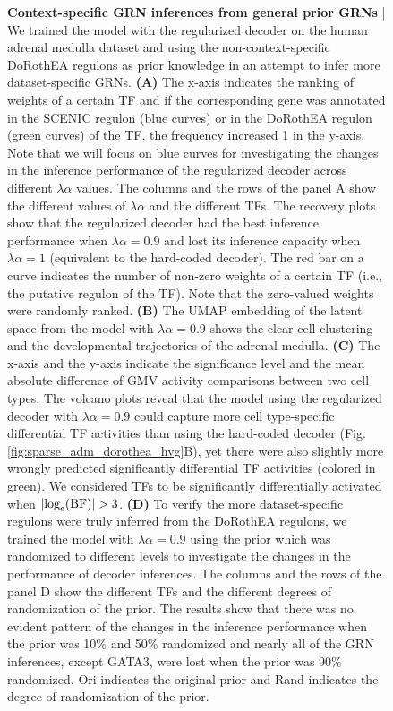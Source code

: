\begin{figure}[b!]
    \caption{\small{\textbf{Context-specific GRN inferences from general prior GRNs} | We trained the model with the regularized decoder on the human adrenal medulla dataset and using the non-context-specific DoRothEA regulons as prior knowledge in an attempt to infer more dataset-specific GRNs. \textbf{(A)} The x-axis indicates the ranking of weights of a certain TF and if the corresponding gene was annotated in the SCENIC regulon (blue curves) or in the DoRothEA regulon (green curves) of the TF, the frequency increased 1 in the y-axis. Note that we will focus on blue curves for investigating the changes in the inference performance of the regularized decoder across different $\lambda\alpha$ values. The columns and the rows of the panel A show the different values of $\lambda\alpha$ and the different TFs. The recovery plots show that the regularized decoder had the best inference performance when $\lambda\alpha = 0.9$ and lost its inference capacity when $\lambda\alpha = 1$ (equivalent to the hard-coded decoder). The red bar on a curve indicates the number of non-zero weights of a certain TF (i.e., the putative regulon of the TF). Note that the zero-valued weights were randomly ranked. \textbf{(B)} The UMAP embedding of the latent space from the model with $\lambda\alpha = 0.9$ shows the clear cell clustering and the developmental trajectories of the adrenal medulla. \textbf{(C)} The x-axis and the y-axis indicate the significance level and the mean absolute difference of GMV activity comparisons between two cell types. The volcano plots reveal that the model using the regularized decoder with $\lambda\alpha = 0.9$ could capture more cell type-specific differential TF activities than using the hard-coded decoder (Fig.\ref{fig:sparse_adm_dorothea_hvg}B), yet there were also slightly more wrongly predicted significantly differential TF activities (colored in green). We considered TFs to be significantly differentially activated when $|\textnormal{log}_e(\textnormal{BF})|>3$. \textbf{(D)} To verify the more dataset-specific regulons were truly inferred from the DoRothEA regulons, we trained the model with $\lambda\alpha = 0.9$ using the prior which was randomized to different levels to investigate the changes in the performance of decoder inferences. The columns and the rows of the panel D show the different TFs and the different degrees of randomization of the prior. The results show that there was no evident pattern of the changes in the inference performance when the prior was 10\% and 50\% randomized and nearly all of the GRN inferences, except GATA3, were lost when the prior was 90\% randomized. Ori indicates the original prior and Rand indicates the degree of randomization of the prior.}}
\end{figure}

